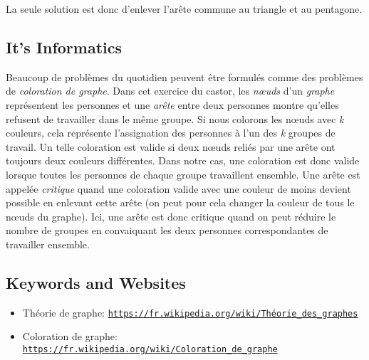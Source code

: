 \documentclass[a4paper,11pt]{report}
\newcommand{\BrochureUrlText}[1]{\texttt{#1}}
\begin{document}
La seule solution est donc d’enlever l’arête commune au triangle et au pentagone.


\subsection*{It’s Informatics}

Beaucoup de problèmes du quotidien peuvent être formulés comme des problèmes de \emph{coloration de graphe}.
Dans cet exercice du castor, les \emph{nœuds} d’un \emph{graphe} représentent les personnes et une \emph{arête} entre deux personnes montre qu’elles refusent de travailler dans le même groupe. Si nous colorons les nœuds avec \emph{k} couleurs, cela représente l’assignation des personnes à l’un des \emph{k} groupes de travail. Un telle coloration est valide si deux nœuds reliés par une arête ont toujours deux couleurs différentes. Dans notre cas, une coloration est donc valide lorsque toutes les personnes de chaque groupe travaillent ensemble. Une arête est appelée \emph{critique} quand une coloration valide avec une couleur de moins devient possible en enlevant cette arête (on peut pour cela changer la couleur de tous le nœuds du graphe). Ici, une arête est donc critique quand on peut réduire le nombre de groupes en convaiquant les deux personnes correspondantes de travailler ensemble.

{\raggedright

\subsection*{Keywords and Websites}

\begin{itemize}
  \item Théorie de graphe: \href{https://fr.wikipedia.org/wiki/Th\%C3\%A9orie_des_graphes}{\BrochureUrlText{https://fr.wikipedia.org/wiki/Théorie\_des\_graphes}}
  \item Coloration de graphe: \href{https://fr.wikipedia.org/wiki/Coloration_de_graphe}{\BrochureUrlText{https://fr.wikipedia.org/wiki/Coloration\_de\_graphe}}
\end{itemize}


}
\end{document}
